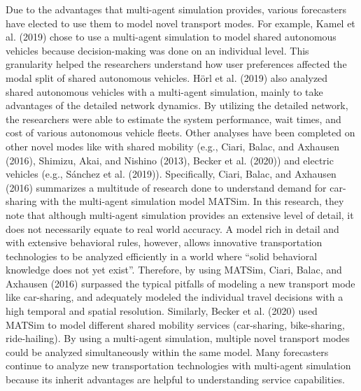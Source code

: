 \documentclass[12pt, oneside, openright]{byuthesis}
\begin{document}
Due to the advantages that multi-agent simulation provides, various forecasters have elected to use them to model novel transport modes. For example, Kamel et al. (2019) chose to use a multi-agent simulation to model shared autonomous vehicles because decision-making was done on an individual level. This granularity helped the researchers understand how user preferences affected the modal split of shared autonomous vehicles. Hörl et al. (2019) also analyzed shared autonomous vehicles with a multi-agent simulation, mainly to take advantages of the detailed network dynamics. By utilizing the detailed network, the researchers were able to estimate the system performance, wait times, and cost of various autonomous vehicle fleets. Other analyses have been completed on other novel modes like with shared mobility (e.g., Ciari, Balac, and Axhausen (2016), Shimizu, Akai, and Nishino (2013), Becker et al. (2020)) and electric vehicles (e.g., Sánchez et al. (2019)). Specifically, Ciari, Balac, and Axhausen (2016) summarizes a multitude of research done to understand demand for car-sharing with the multi-agent simulation model MATSim. In this research, they note that although multi-agent simulation provides an extensive level of detail, it does not necessarily equate to real world accuracy. A model rich in detail and with extensive behavioral rules, however, allows innovative transportation technologies to be analyzed efficiently in a world where ``solid behavioral knowledge does not yet exist''. Therefore, by using MATSim, Ciari, Balac, and Axhausen (2016) surpassed the typical pitfalls of modeling a new transport mode like car-sharing, and adequately modeled the individual travel decisions with a high temporal and spatial resolution. Similarly, Becker et al. (2020) used MATSim to model different shared mobility services (car-sharing, bike-sharing, ride-hailing). By using a multi-agent simulation, multiple novel transport modes could be analyzed simultaneously within the same model. Many forecasters continue to analyze new transportation technologies with multi-agent simulation because its inherit advantages are helpful to understanding service capabilities.
\end{document}
